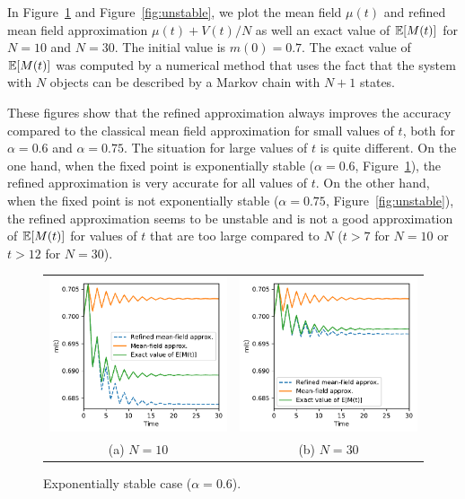 \documentclass{sig-alternate-per}
\newcommand\esp[1]{{\mathchoice{\besp{#1}}{\sesp{#1}}{\sesp{#1}}{\sesp{#1}}}}
\newcommand\besp[1]{\mathbb{E}\left[#1\right]}
\newcommand\sesp[1]{\mathbb{E}[#1]}
\begin{document}
In Figure~\ref{fig:stable} and Figure~\ref{fig:unstable}, we plot the
mean field $\mu(t)$ and refined mean field approximation
$\mu(t)+V(t)/N$ as well an exact value of $\esp{M(t)}$ for $N=10$ and
$N=30$. The initial value is $m(0)=0.7$. The exact value of
$\esp{M(t)}$ was computed by a numerical method that uses the fact
that the system with $N$ objects can be described by a Markov chain
with $N+1$ states.

These figures show that the refined approximation always improves the
accuracy compared to the classical mean field approximation for small
values of $t$, both for $\alpha=0.6$ and $\alpha=0.75$. The situation
for large values of $t$ is quite different. On the one hand, when the
fixed point is exponentially stable ($\alpha=0.6$,
Figure~\ref{fig:stable}), the refined approximation is very accurate
for all values of $t$. On the other hand, when the fixed point is not
exponentially stable ($\alpha=0.75$, Figure~\ref{fig:unstable}), the
refined approximation seems to be unstable and is not a good
approximation of $\esp{M(t)}$ for values of $t$ that are too large
compared to $N$ ($t>7$ for $N=10$ or $t>12$ for $N=30$).

\begin{figure}[ht]
  \centering
  \begin{tabular}{@{}c@{}c@{}}
    \includegraphics[width=.5\linewidth]{unstable1D_a60_N10}
    &\includegraphics[width=.5\linewidth]{unstable1D_a60_N30}\\
    (a) $N=10$ & (b) $N=30$
  \end{tabular}
  \caption{Exponentially stable case ($\alpha=0.6$).}
  \label{fig:stable}
\end{figure}
\end{document}
